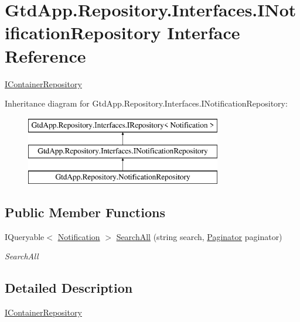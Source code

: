 \hypertarget{interface_gtd_app_1_1_repository_1_1_interfaces_1_1_i_notification_repository}{}\section{Gtd\+App.\+Repository.\+Interfaces.\+I\+Notification\+Repository Interface Reference}
\label{interface_gtd_app_1_1_repository_1_1_interfaces_1_1_i_notification_repository}


\mbox{\hyperlink{interface_gtd_app_1_1_repository_1_1_interfaces_1_1_i_container_repository}{I\+Container\+Repository}}  


Inheritance diagram for Gtd\+App.\+Repository.\+Interfaces.\+I\+Notification\+Repository\+:\begin{figure}[H]
\begin{center}
\leavevmode
\includegraphics[height=3.000000cm]{interface_gtd_app_1_1_repository_1_1_interfaces_1_1_i_notification_repository}
\end{center}
\end{figure}
\subsection*{Public Member Functions}
\begin{DoxyCompactItemize}
\item 
I\+Queryable$<$ \mbox{\hyperlink{class_gtd_app_1_1_data_1_1_notification}{Notification}} $>$ \mbox{\hyperlink{interface_gtd_app_1_1_repository_1_1_interfaces_1_1_i_notification_repository_ace09da4279367d4edb68b6094c13d8e2}{Search\+All}} (string search, \mbox{\hyperlink{class_gtd_app_1_1_repository_1_1_paginator}{Paginator}} paginator)
\begin{DoxyCompactList}\small\item\em Search\+All \end{DoxyCompactList}\end{DoxyCompactItemize}


\subsection{Detailed Description}
\mbox{\hyperlink{interface_gtd_app_1_1_repository_1_1_interfaces_1_1_i_container_repository}{I\+Container\+Repository}} 



